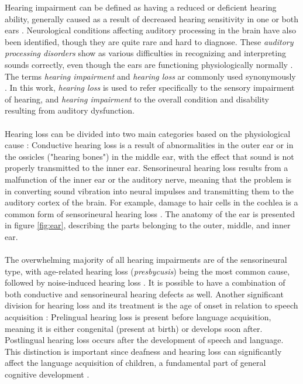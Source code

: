 \documentclass[english, 12pt, a4paper, pdftex, elec, utf8]{aaltothesis}
\begin{document}
Hearing impairment can be defined as having a reduced or deficient hearing ability, generally caused as a result of decreased hearing sensitivity in one or both ears \cite{moore2007cochlear, ohlenforst2017effects}. Neurological conditions affecting auditory processing in the brain have also been identified, though they are quite rare and hard to diagnose. These \textit{auditory processing disorders} show as various difficulties in recognizing and interpreting sounds correctly, even though the ears are functioning physiologically normally \cite{deafness}. The terms \textit{hearing impairment} and \textit{hearing loss} ar commonly used synonymously \cite{moore2007cochlear}. In this work, \textit{hearing loss} is used to refer specifically to the sensory impairment of hearing, and \textit{hearing impairment} to the overall condition and disability resulting from auditory dysfunction. \\\\
Hearing loss can be divided into two main categories based on the physiological cause \cite{moore2007cochlear, deafness}: Conductive hearing loss is a result of abnormalities in the outer ear or in the ossicles ("hearing bones") in the middle ear, with the effect that sound is not properly transmitted to the inner ear. Sensorineural hearing loss results from a malfunction of the inner ear or the auditory nerve, meaning that the problem is in converting sound vibration into neural impulses and transmitting them to the auditory cortex of the brain. For example, damage to hair cells in the cochlea is a common form of sensorineural hearing loss \cite{moore2007cochlear}. The anatomy of the ear is presented in figure \ref{fig:ear}, describing the parts belonging to the outer, middle, and inner ear. \\\\
The overwhelming majority of all hearing impairments are of the sensorineural type, with age-related hearing loss (\textit{presbycusis}) being the most common cause, followed by noise-induced hearing loss \cite{koskela2013kuulokojeen}. It is possible to have a combination of both conductive and sensorineural hearing defects as well. Another significant division for hearing loss and its treatment is the age of onset in relation to speech acquisition \cite{deafness, raino2012sisakorvaistutteen}: Prelingual hearing loss is present before language acquisition, meaning it is either congenital (present at birth) or develops soon after. Postlingual hearing loss occurs after the development of speech and language. This distinction is important since deafness and hearing loss can significantly affect the language acquisition of children, a fundamental part of general cognitive development \cite{wilson2017global, moore2007cochlear, raino2012sisakorvaistutteen}. \\
\end{document}
